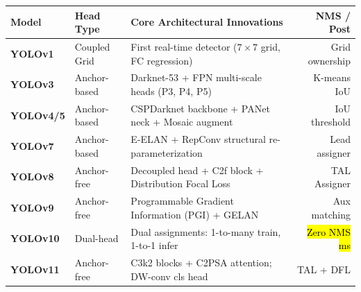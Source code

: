 \begin{mem}
\begin{tabularx}{\columnwidth}{@{}p{14mm} p{17mm} X r@{}}
\toprule
\textbf{Model} & \textbf{Head Type} & \textbf{Core Architectural Innovations} & \textbf{NMS / Post} \\
\midrule
\textbf{YOLOv1} & Coupled Grid & First real-time detector ($7\times 7$ grid, FC regression) & Grid ownership \\
\textbf{YOLOv3} & Anchor-based & Darknet-53 + FPN multi-scale heads (P3, P4, P5) & K-means IoU \\
\textbf{YOLOv4/5} & Anchor-based & CSPDarknet backbone + PANet neck + Mosaic augment & IoU threshold \\
\textbf{YOLOv7} & Anchor-based & E-ELAN + RepConv structural re-parameterization & Lead assigner \\
\textbf{YOLOv8} & Anchor-free & Decoupled head + C2f block + Distribution Focal Loss & TAL Assigner \\
\textbf{YOLOv9} & Anchor-free & Programmable Gradient Information (PGI) + GELAN & Aux matching \\
\textbf{YOLOv10} & Dual-head & Dual assignments: 1-to-many train, 1-to-1 infer & \hl{Zero NMS ms} \\
\textbf{YOLOv11} & Anchor-free & C3k2 blocks + C2PSA attention; DW-conv cls head & TAL + DFL \\
\bottomrule
\end{tabularx}
\end{mem}

